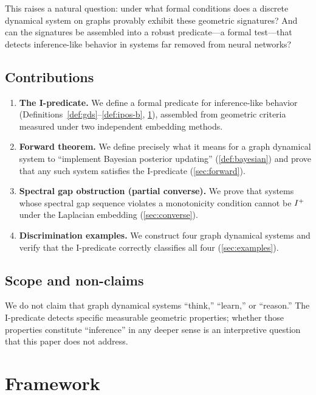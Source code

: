 \documentclass{../shared/primo}
\begin{document}
This raises a natural question: under what formal conditions does a discrete dynamical system on graphs provably exhibit these geometric signatures? And can the signatures be assembled into a robust predicate---a formal test---that detects inference-like behavior in systems far removed from neural networks?

\subsection{Contributions}

\begin{enumerate}
\item \textbf{The I-predicate.} We define a formal predicate for inference-like behavior (Definitions~\ref{def:gds}--\ref{def:ipos-b}, \cref{sec:framework}), assembled from geometric criteria measured under two independent embedding methods.

\item \textbf{Forward theorem.} We define precisely what it means for a graph dynamical system to ``implement Bayesian posterior updating'' (\cref{def:bayesian}) and prove that any such system satisfies the I-predicate (\cref{sec:forward}).

\item \textbf{Spectral gap obstruction (partial converse).} We prove that systems whose spectral gap sequence violates a monotonicity condition cannot be $I\textsuperscript{+}$ under the Laplacian embedding (\cref{sec:converse}).

\item \textbf{Discrimination examples.} We construct four graph dynamical systems and verify that the I-predicate correctly classifies all four (\cref{sec:examples}).
\end{enumerate}

\subsection{Scope and non-claims}

We do not claim that graph dynamical systems ``think,'' ``learn,'' or ``reason.'' The I-predicate detects specific measurable geometric properties; whether those properties constitute ``inference'' in any deeper sense is an interpretive question that this paper does not address.


\section{Framework}
\label{sec:framework}
\end{document}
